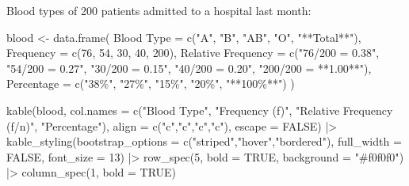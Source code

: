 \documentclass[
  12pt,
  letterpaper,
]{book}
\newenvironment{Shaded}{\begin{snugshade}}{\end{snugshade}}
\newcommand{\AttributeTok}[1]{\textcolor[rgb]{0.40,0.45,0.13}{#1}}
\newcommand{\ConstantTok}[1]{\textcolor[rgb]{0.56,0.35,0.01}{#1}}
\newcommand{\DecValTok}[1]{\textcolor[rgb]{0.68,0.00,0.00}{#1}}
\newcommand{\FunctionTok}[1]{\textcolor[rgb]{0.28,0.35,0.67}{#1}}
\newcommand{\NormalTok}[1]{\textcolor[rgb]{0.00,0.23,0.31}{#1}}
\newcommand{\OtherTok}[1]{\textcolor[rgb]{0.00,0.23,0.31}{#1}}
\newcommand{\SpecialCharTok}[1]{\textcolor[rgb]{0.37,0.37,0.37}{#1}}
\newcommand{\StringTok}[1]{\textcolor[rgb]{0.13,0.47,0.30}{#1}}
\begin{document}
\begin{tcolorbox}[enhanced jigsaw, arc=.35mm, bottomrule=.15mm, bottomtitle=1mm, breakable, colback=white, colbacktitle=quarto-callout-tip-color!10!white, colframe=quarto-callout-tip-color-frame, coltitle=black, left=2mm, leftrule=.75mm, opacityback=0, opacitybacktitle=0.6, rightrule=.15mm, title={📋 Example}, titlerule=0mm, toprule=.15mm, toptitle=1mm]

Blood types of 200 patients admitted to a hospital last month:

\begin{Shaded}
\begin{Highlighting}[]
\NormalTok{blood }\OtherTok{\textless{}{-}} \FunctionTok{data.frame}\NormalTok{(}
  \StringTok{\textasciigrave{}}\AttributeTok{Blood Type}\StringTok{\textasciigrave{}} \OtherTok{=} \FunctionTok{c}\NormalTok{(}\StringTok{"A"}\NormalTok{, }\StringTok{"B"}\NormalTok{, }\StringTok{"AB"}\NormalTok{, }\StringTok{"O"}\NormalTok{, }\StringTok{"**Total**"}\NormalTok{),}
  \AttributeTok{Frequency =} \FunctionTok{c}\NormalTok{(}\DecValTok{76}\NormalTok{, }\DecValTok{54}\NormalTok{, }\DecValTok{30}\NormalTok{, }\DecValTok{40}\NormalTok{, }\DecValTok{200}\NormalTok{),}
  \StringTok{\textasciigrave{}}\AttributeTok{Relative Frequency}\StringTok{\textasciigrave{}} \OtherTok{=} \FunctionTok{c}\NormalTok{(}\StringTok{"76/200 = 0.38"}\NormalTok{, }\StringTok{"54/200 = 0.27"}\NormalTok{,}
                             \StringTok{"30/200 = 0.15"}\NormalTok{, }\StringTok{"40/200 = 0.20"}\NormalTok{,}
                             \StringTok{"200/200 = **1.00**"}\NormalTok{),}
  \AttributeTok{Percentage =} \FunctionTok{c}\NormalTok{(}\StringTok{"38\%"}\NormalTok{, }\StringTok{"27\%"}\NormalTok{, }\StringTok{"15\%"}\NormalTok{, }\StringTok{"20\%"}\NormalTok{, }\StringTok{"**100\%**"}\NormalTok{)}
\NormalTok{)}

\FunctionTok{kable}\NormalTok{(blood,}
      \AttributeTok{col.names =} \FunctionTok{c}\NormalTok{(}\StringTok{"Blood Type"}\NormalTok{, }\StringTok{"Frequency (f)"}\NormalTok{,}
                    \StringTok{"Relative Frequency (f/n)"}\NormalTok{, }\StringTok{"Percentage"}\NormalTok{),}
      \AttributeTok{align =} \FunctionTok{c}\NormalTok{(}\StringTok{"c"}\NormalTok{,}\StringTok{"c"}\NormalTok{,}\StringTok{"c"}\NormalTok{,}\StringTok{"c"}\NormalTok{), }\AttributeTok{escape =} \ConstantTok{FALSE}\NormalTok{) }\SpecialCharTok{|\textgreater{}}
  \FunctionTok{kable\_styling}\NormalTok{(}\AttributeTok{bootstrap\_options =} \FunctionTok{c}\NormalTok{(}\StringTok{"striped"}\NormalTok{,}\StringTok{"hover"}\NormalTok{,}\StringTok{"bordered"}\NormalTok{),}
                \AttributeTok{full\_width =} \ConstantTok{FALSE}\NormalTok{, }\AttributeTok{font\_size =} \DecValTok{13}\NormalTok{) }\SpecialCharTok{|\textgreater{}}
  \FunctionTok{row\_spec}\NormalTok{(}\DecValTok{5}\NormalTok{, }\AttributeTok{bold =} \ConstantTok{TRUE}\NormalTok{, }\AttributeTok{background =} \StringTok{"\#f0f0f0"}\NormalTok{) }\SpecialCharTok{|\textgreater{}}
  \FunctionTok{column\_spec}\NormalTok{(}\DecValTok{1}\NormalTok{, }\AttributeTok{bold =} \ConstantTok{TRUE}\NormalTok{)}
\end{Highlighting}
\end{Shaded}


\end{tcolorbox}
\end{document}
